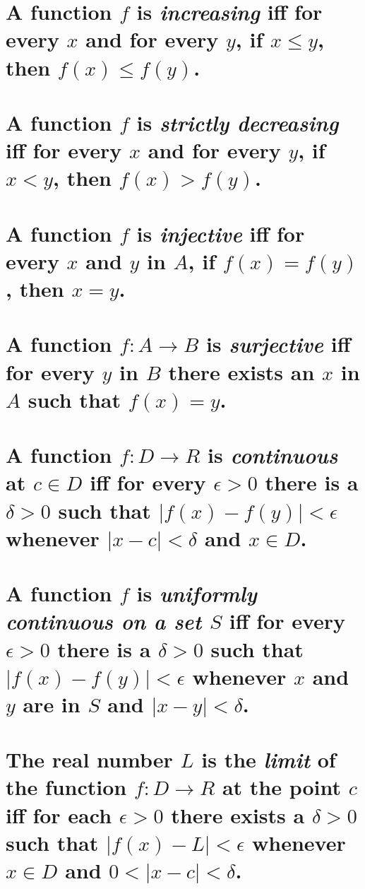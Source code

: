 \documentclass[11pt]{article} %
\begin{document}
\section{A function $f$ is \textit{increasing} iff for every $x$ and for every $y$, if $x\leq y$, then $f(x)\leq f(y)$.}

\section{A function $f$ is \textit{strictly decreasing} iff for every $x$ and for every $y$, if $x<y$, then $f(x)>f(y)$.}

\section{A function $f$ is \textit{injective} iff for every $x$ and $y$ in $A$, if $f(x)=f(y)$, then $x=y$.}

\section{A function $f:A\rightarrow B$ is \textit{surjective} iff for every $y$ in $B$ there exists an $x$ in $A$ such that $f(x)=y$.}

\section{A function $f:D\rightarrow R$ is \textit{continuous} at $c \in D$ iff for every $\epsilon>0$ there is a $\delta>0$ such that $\mid f(x)-f(y)\mid<\epsilon$ whenever $\mid x-c\mid<\delta$ and $x\in D$.}

\section{A function $f$ is \textit{uniformly continuous on a set $S$} iff for every $\epsilon>0$ there is a $\delta>0$ such that $\mid f(x)-f(y)\mid<\epsilon$ whenever $x$ and $y$ are in $S$ and $\mid x-y\mid<\delta$.}

\section{The real number $L$ is the \textit{limit} of the function $f:D\rightarrow R$ at the point $c$ iff for each $\epsilon>0$ there exists a $\delta>0$ such that $\mid f(x)-L\mid<\epsilon$ whenever $x\in D$ and $0<\mid x-c\mid<\delta$.}
\end{document}

